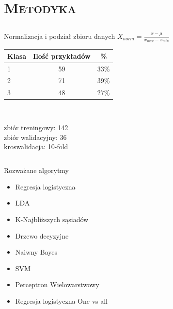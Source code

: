 \documentclass[xcolor=x11names,compress]{beamer}
\renewcommand{\(}{\begin{columns}}
\renewcommand{\)}{\end{columns}}
\newcommand{\<}[1]{\begin{column}{#1}}
\renewcommand{\>}{\end{column}}
\begin{document}
\section{\scshape Metodyka}
\subsection{}
\begin{frame}{Normalizacja i podział zbioru danych}
	$X_{norm} = \frac{x - \mu}{x_{max} -x_{min}}$ \\
	
    \begin{table}[t]
    \begin{tabular}{|l|c|c|}
      \hline 
      Klasa &  Ilość przykładów & \%\\
      \hline 
      1 & 59 & 33\%\\
      \hline
      2 & 71 & 39\%\\
      \hline
      3 & 48 & 27\%\\
      \hline
    \end{tabular} \\
    \end{table}

zbiór treningowy: 142 \\
zbiór walidacyjny: 36 \\
kroswalidacja: 10-fold \\

\end{frame}

\subsection{}
\begin{frame}{Rozważane algorytmy}
	\begin{itemize}
	\item Regresja logistyczna
	\item LDA
	\item K-Najbliższych sąsiadów
	\item Drzewo decyzyjne
	\item Naiwny Bayes
	\item SVM
	\item Perceptron Wielowarstwowy
	\item Regresja logistyczna One vs all

\end{itemize}
\end{frame}
\end{document}
